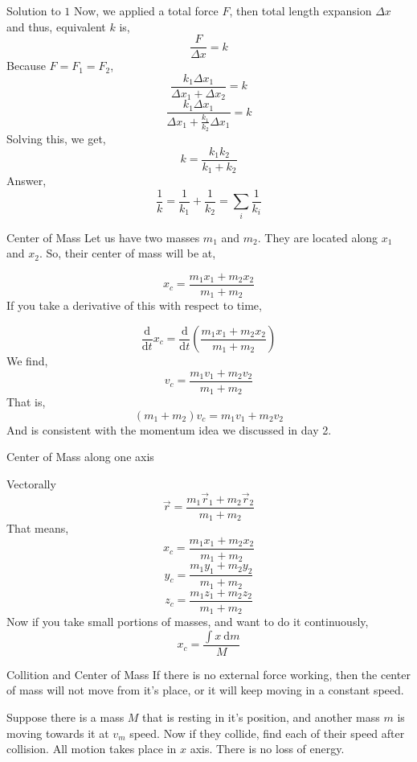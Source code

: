 \documentclass[9pt ]{memoir}
\newcommand{\prob}[1]{ \begin{problem.} #1 \end{problem.}}
\newcommand{\draw}[3]{ \begin{figure}[hbt!] \centering
 \fontsize{35pt}{20pt}\selectfont \resizebox{#1 \textwidth}{!}{
{#2.pdf_tex}}\caption{#3} \label{#3} \end{figure} }
\begin{document}
\begin{frame}
    {Solution to $1$ }
    Now, we applied a total force $F$, then total length expansion $\Delta x$ and thus, equivalent $k$ is, 
    \[ \frac{F}{\Delta x} = k \]
    Because $F = F_1 = F_2$, 
    \[ \frac{k_1 \Delta x_1}{\Delta x_1 + \Delta x_2} = k \]
   \[ \frac{k_1 \Delta x_1}{ \Delta x_1 + \frac{k_1}{k_2} \Delta x_1 } = k \]
   Solving this, we get, 
  \[ k = \frac{k_1 k_2 }{k_1 + k_2} \]
   Answer, 
   \[ \boxed{ \frac{1}{k} = \frac{1}{k_1} + \frac{1}{k_2} = \sum_{i} \frac{1}{k_i}} \]
   
   
\end{frame}


\begin{frame}
    {Center of Mass}
    Let us have two masses $m_1$ and $m_2$. They are located along $x_1 $ and $x_2$. So, their center of mass will be at, 
    
    \[ x_c = \frac{m_1x_1 + m_2 x_2 }{m_1 + m_2} \]
    If you take a derivative of  this with respect to time, 

    \[ \frac{\mathrm{d} }{\mathrm{d} t} x_c = \frac{\mathrm{d} }{\mathrm{d} t} \left(\frac{m_1x_1 + m_2 x_2 }{m_1 + m_2}\right) \] 
    We find, 
    \[ v_c = \frac{m_1 v_1 + m_2 v_2}{ m_1 + m_2} \]
    That is, 
    \[ \left( m_1 + m_2 \right) v_c = m_1 v_1 + m_2 v_2 \]
    And is consistent with the momentum idea we discussed in day 2. 
\end{frame}

\begin{frame}
    {Center of Mass along one axis}
    \draw{0.7}{com}{}
\end{frame}

\begin{frame}
    {Vectorally}
    \[ \vec r = \frac{m_1 \vec r_1 + m_2 \vec r_2 }{m_1 + m_2} \]
\pause
That means, 
\[ x_c =   \frac{m_1x_1 + m_2 x_2 }{m_1 + m_2} \]
\[ y_c =   \frac{m_1y_1 + m_2 y_2 }{m_1 + m_2} \]
\[ z_c =  \frac{m_1z_1 + m_2 z_2 }{m_1 + m_2}  \]
\pause
Now if you take small portions of masses, and want to do it continuously,
\[ x_c = \frac{\int x \ \mathrm{d} m}{M} \]

\end{frame}


\begin{frame}
    {Collition and Center of Mass}
    If there is no external force working, then the center of mass will not move from it's place, or it will keep moving in a constant speed.  
    {
    \prob{Suppose there is a mass $M$ that is resting in it's position, and another mass $m$ is moving towards it at $v_m$ speed. Now if they collide, find each of their speed after collision. All motion takes place in $x$ axis. There is no loss of energy.}}{\draw{1}{prob2-1}{}} 
\end{frame}
\end{document}
